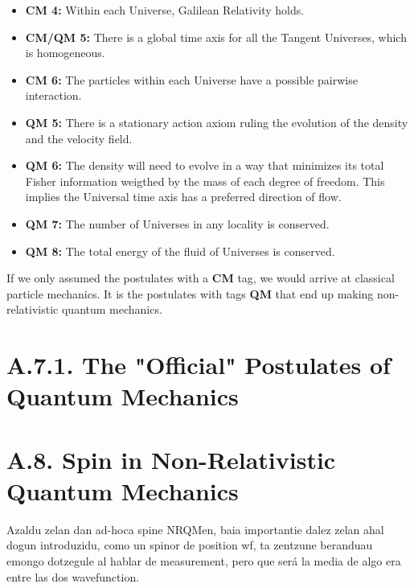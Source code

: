\documentclass[11pt, a4paper]{article} %
\begin{document}
\begin{itemize}
\item {\bf CM 4:} Within each Universe, Galilean Relativity holds.

\item {\bf CM/QM 5:} There is a global time axis for all the Tangent Universes, which is homogeneous.

\item {\bf CM 6:} The particles within each Universe have a possible pairwise interaction.

\item {\bf QM 5:} There is a stationary action axiom ruling the evolution of the density and the velocity field.

\item {\bf QM 6:} The density will need to evolve in a way that minimizes its total Fisher information weigthed by the mass of each degree of freedom. This implies the Universal time axis has a preferred direction of flow.

\item {\bf QM 7:} The number of Universes in any locality is conserved.

\item {\bf QM 8:} The total energy of the fluid of Universes is conserved.

\end{itemize}
If we only assumed the postulates with a {\bf CM} tag, we would arrive at classical particle mechanics. It is the postulates with tags {\bf QM} that end up making non-relativistic quantum mechanics.

\section*{A.7.1. The "Official" Postulates of Quantum Mechanics}

\newpage

\section*{A.8. Spin in Non-Relativistic Quantum Mechanics}
\iffalse
Azaldu zelan dan ad-hoca spine NRQMen, baia importantie dalez zelan ahal dogun introduzidu, como un spinor de position wf, ta zentzune beranduau emongo dotzegule al hablar de measurement, pero que será la media de algo era entre las dos wavefunction.
\end{document}
